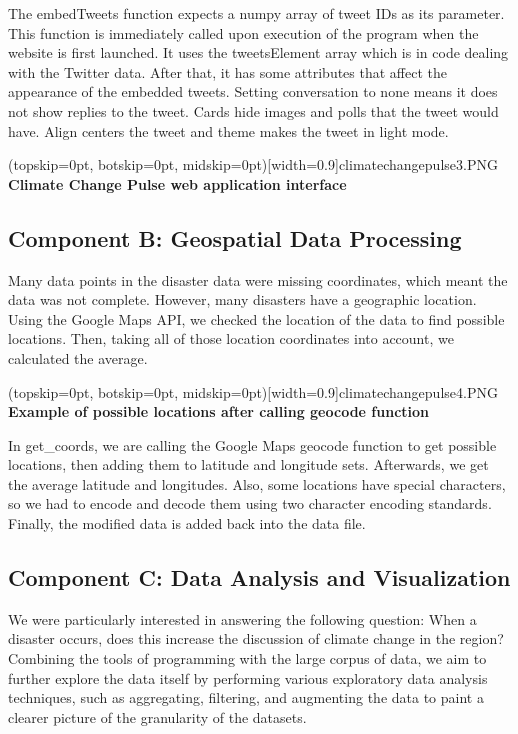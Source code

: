 \documentclass{ieeeaccess}
\begin{document}
The embedTweets function expects a numpy array of tweet IDs as its parameter. This function is immediately called upon execution of the program when the website is first launched. It uses the tweetsElement array which is in code dealing with the Twitter data. After that, it has some attributes that affect the appearance of the embedded tweets. Setting conversation to none means it does not show replies to the tweet. Cards hide images and polls that the tweet would have. Align centers the tweet and theme makes the tweet in light mode.

\Figure[t!](topskip=0pt, botskip=0pt, midskip=0pt)[width=0.9\columnwidth]{climatechangepulse3.PNG}
{ \textbf{Climate Change Pulse web application interface}\label{fig2}}

\subsection{Component B: Geospatial Data Processing}
Many data points in the disaster data were missing coordinates, which meant the data was not complete. However, many disasters have a geographic location. Using the Google Maps API, we checked the location of the data to find possible locations. Then, taking all of those location coordinates into account, we calculated the average.

\Figure[t!](topskip=0pt, botskip=0pt, midskip=0pt)[width=0.9\columnwidth]{climatechangepulse4.PNG}
{ \textbf{Example of possible locations after calling geocode function}\label{fig3}}

In get\_coords, we are calling the Google Maps geocode function to get possible locations, then adding them to latitude and longitude sets. Afterwards, we get the average latitude and longitudes. Also, some locations have special characters, so we had to encode and decode them using two character encoding standards. Finally, the modified data is added back into the data file.

\subsection{Component C: Data Analysis and Visualization}
We were particularly interested in answering the following question: When a disaster occurs, does this increase the discussion of climate change in the region? Combining the tools of programming with the large corpus of data, we aim to further explore the data itself by performing various exploratory data analysis techniques, such as aggregating, filtering, and augmenting the data to paint a clearer picture of the granularity of the datasets.
\end{document}
